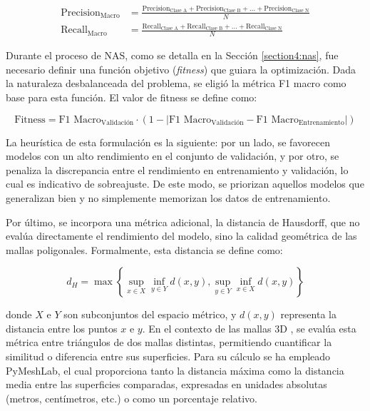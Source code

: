 \begin{align}
    \text{Precision}_{\text{Macro}} &= \frac{\text{Precision}_{\text{Clase A}}+\text{Precision}_{\text{Clase B}}+\dots+\text{Precision}_{\text{Clase N}}}{N} \\
    \text{Recall}_{\text{Macro}} &= \frac{\text{Recall}_{\text{Clase A}}+\text{Recall}_{\text{Clase B}}+\dots+\text{Recall}_{\text{Clase N}}}{N}
\end{align}

Durante el proceso de NAS, como se detalla en la Sección \ref{section4:nas}, fue necesario definir una función objetivo (\textit{fitness}) que guiara la optimización. Dada la naturaleza desbalanceada del problema, se eligió la métrica F1 macro como base para esta función. El valor de fitness se define como:

\begin{equation}
    \text{Fitness} = \text{F1 Macro}_{\text{Validación}} \cdot (1 - | \text{F1 Macro}_{\text{Validación}} -  \text{F1 Macro}_{\text{Entrenamiento}}|)
\end{equation}

La heurística de esta formulación es la siguiente: por un lado, se favorecen modelos con un alto rendimiento en el conjunto de validación, y por otro, se penaliza la discrepancia entre el rendimiento en entrenamiento y validación, lo cual es indicativo de sobreajuste. De este modo, se priorizan aquellos modelos que generalizan bien y no simplemente memorizan los datos de entrenamiento.

Por último, se incorpora una métrica adicional, la distancia de Hausdorff, que no evalúa directamente el rendimiento del modelo, sino la calidad geométrica de las mallas poligonales. Formalmente, esta distancia se define como:

\begin{equation}
d_H = \max\left\{\sup_{x\in X} \inf_{y \in Y} d(x,y), \sup_{y\in Y} \inf_{x \in X} d(x,y) \right\}
\end{equation}

donde $X$ e $Y$ son subconjuntos del espacio métrico, y $d(x,y)$ representa la distancia entre los puntos $x$ e $y$. En el contexto de las mallas 3D \cite{cignoni1998metro}, se evalúa esta métrica entre triángulos de dos mallas distintas, permitiendo cuantificar la similitud o diferencia entre sus superficies. Para su cálculo se ha empleado PyMeshLab, el cual proporciona tanto la distancia máxima como la distancia media entre las superficies comparadas, expresadas en unidades absolutas (metros, centímetros, etc.) o como un porcentaje relativo.

